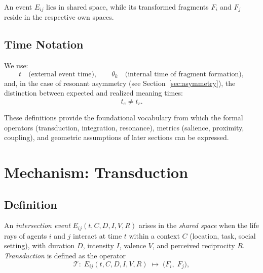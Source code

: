 \documentclass[12pt,a4paper]{article}
\begin{document}
An event $E_{ij}$ lies in shared space, while its transformed fragments 
$F_i$ and $F_j$ reside in the respective own spaces.

\subsection{Time Notation}

We use:
\[
t \quad \text{(external event time)}, \qquad 
\theta_k \quad \text{(internal time of fragment formation)},
\]
and, in the case of resonant asymmetry (see Section~\ref{sec:asymmetry}),
the distinction between expected and realized meaning times:
\[
t_e \neq t_r.
\]

These definitions provide the foundational vocabulary from which the 
formal operators (transduction, integration, resonance), metrics 
(salience, proximity, coupling), and geometric assumptions of later 
sections can be expressed.

\section{Mechanism: Transduction}

\subsection{Definition}
An \emph{intersection event} $E_{ij}(t,C,D,I,V,R)$ arises in the
\emph{shared space} when the life rays of agents $i$ and $j$
interact at time $t$ within a context $C$ (location, task, social
setting), with duration $D$, intensity $I$, valence $V$, and
perceived reciprocity $R$.
\emph{Transduction} is defined as the operator
\[
\mathcal{T}:\;
E_{ij}(t,C,D,I,V,R)
\;\mapsto\;
\big(F_i,\;F_j\big),
\]
\end{document}
